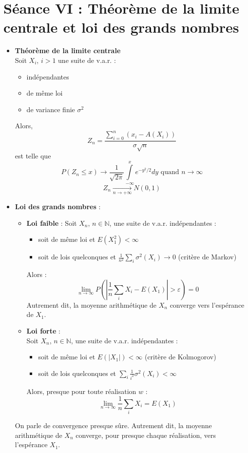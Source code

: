 \documentclass[a4paper,11pt]{report}
\begin{document}
\section{Séance VI : Théorème de la limite centrale et loi des grands nombres}
\begin{itemize}
	\item \textbf{Théorème de la limite centrale} \\
	Soit $X_i$, $i>1$ une suite de v.a.r. :
	\begin{itemize}
		\item indépendantes
		\item de même loi
		\item de variance finie $\sigma^2$
	\end{itemize}
	Alors,
	\[
		Z_n = \frac{\sum\limits_{i=0}^{n}{(x_i-A(X_i))}}{\sigma\sqrt{n}}
	\]
	est telle que
	\[
		P(Z_n \le x) \rightarrow
		\frac1{\sqrt{2\pi}}
		\int\limits_{-\infty}^{x}{e^{-y^2/2}dy}
		\text{ quand }n\rightarrow \infty
	\]
	\[
		Z_n \underset{n\to+\infty}{\longrightarrow} N(0,1)
	\]
	\item \textbf{Loi des grands nombres} :
	\begin{itemize}
		\item \textbf{Loi faible} :
		Soit $X_n$, $n \in \mathbb{N}$, une suite de v.a.r. indépendantes :
		\begin{itemize}
			\item soit de même loi et $E(X_1^2) < \infty$
			\item soit de lois quelconques et $\frac{1}{n^2}\sum\limits_{i}{\sigma^2(X_i) \rightarrow 0}$ (critère de Markov)
		\end{itemize}
		Alors :
		\[
			\lim\limits_{n\rightarrow \infty}
			{P\left(\left|\frac{1}{n}\sum\limits_{i}{X_i}-E(X_1)\right|
			>\varepsilon\right)} = 0
		\]
		Autrement dit, la moyenne arithmétique de $X_n$ converge vers l'espérance de $X_1$.
		\item \textbf{Loi forte} :\\
		Soit $X_n$, $n \in \mathbb{N}$, une suite de v.a.r. indépendantes :
		\begin{itemize}
			\item soit de même loi et $E(|X_1|) < \infty$ (critère de Kolmogorov)
			\item soit de lois quelconques et $\sum\limits_{i}{}\frac{1}{i^2}\sigma^2(X_i) < \infty$
		\end{itemize}
		Alors, presque pour toute réalisation $w$ :
		\[
			\lim\limits_{n \rightarrow \infty}
			\frac1n\sum\limits_i{X_i} = E(X_1)
		\]
	\end{itemize}
	On parle de convergence presque sûre.
	Autrement dit, la moyenne arithmétique de $X_n$ converge,
	pour presque chaque réalisation, vers l'espérance $X_1$.
\end{itemize}
\end{document}
